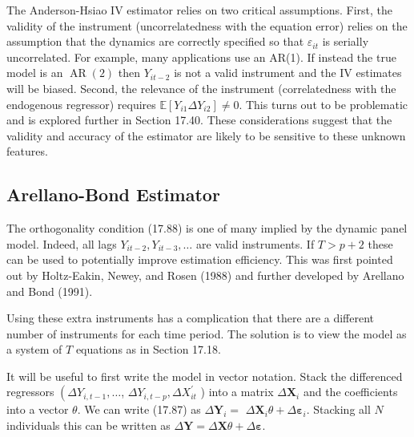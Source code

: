 \documentclass[10pt]{article}
\begin{document}
The Anderson-Hsiao IV estimator relies on two critical assumptions. First, the validity of the instrument (uncorrelatedness with the equation error) relies on the assumption that the dynamics are correctly specified so that $\varepsilon_{i t}$ is serially uncorrelated. For example, many applications use an AR(1). If instead the true model is an $\operatorname{AR}(2)$ then $Y_{i t-2}$ is not a valid instrument and the IV estimates will be biased. Second, the relevance of the instrument (correlatedness with the endogenous regressor) requires $\mathbb{E}\left[Y_{i 1} \Delta Y_{i 2}\right] \neq 0$. This turns out to be problematic and is explored further in Section 17.40. These considerations suggest that the validity and accuracy of the estimator are likely to be sensitive to these unknown features.

\subsection{Arellano-Bond Estimator}
The orthogonality condition (17.88) is one of many implied by the dynamic panel model. Indeed, all lags $Y_{i t-2}, Y_{i t-3}, \ldots$ are valid instruments. If $T>p+2$ these can be used to potentially improve estimation efficiency. This was first pointed out by Holtz-Eakin, Newey, and Rosen (1988) and further developed by Arellano and Bond (1991).

Using these extra instruments has a complication that there are a different number of instruments for each time period. The solution is to view the model as a system of $T$ equations as in Section 17.18.

It will be useful to first write the model in vector notation. Stack the differenced regressors $\left(\Delta Y_{i, t-1}, \ldots\right.$, $\Delta Y_{i, t-p}, \Delta X_{i t}^{\prime}$ ) into a matrix $\Delta \boldsymbol{X}_{i}$ and the coefficients into a vector $\theta$. We can write (17.87) as $\Delta \boldsymbol{Y}_{i}=$ $\Delta \boldsymbol{X}_{i} \theta+\Delta \boldsymbol{\varepsilon}_{i}$. Stacking all $N$ individuals this can be written as $\Delta \boldsymbol{Y}=\Delta \boldsymbol{X} \theta+\Delta \boldsymbol{\varepsilon}$.
\end{document}
